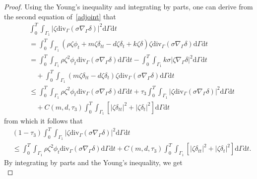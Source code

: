 \documentclass[10pt]{elsarticle}
\begin{document}
\begin{proof}
Using the Young's inequality and integrating by parts, one can derive from the second equation of~\eqref{adjoint} that
 \begin{equation*}
\begin{split}
&\int_{0}^{T}\int_{\Gamma_1}{|\zeta\mathrm{div}_{\Gamma}\left(\sigma\nabla_{\Gamma} {\delta}\right)|^2} \mathrm{d}\Gamma \mathrm{d}t\\
&=\int_{0}^{T}\int_{\Gamma_1}\left(\rho \zeta{\phi}_t+m \zeta{\delta}_{tt}- d \zeta{\delta}_t+ k \zeta{\delta} \right)\zeta\mathrm{div}_{\Gamma}\left(\sigma\nabla_{\Gamma} {\delta}\right) \mathrm{d}\Gamma \mathrm{d}t\\
&=\int_{0}^{T}\int_{\Gamma_1} \rho \zeta^2 {\phi}_t \mathrm{div}_{\Gamma}\left(\sigma\nabla_{\Gamma}{\delta}\right) \mathrm{d}\Gamma \mathrm{d}t -\int_{0}^{T}\int_{\Gamma_1}k\sigma|\zeta\nabla_{\Gamma} {\delta}|^2\mathrm{d}\Gamma \mathrm{d}t\\
&\quad+ \int_{0}^{T}\int_{\Gamma_1}\left(m \zeta{\delta}_{tt}- d \zeta{\delta}_t \right)\zeta \mathrm{div}_{\Gamma}\left(\sigma\nabla_{\Gamma} {\delta}\right) \mathrm{d}\Gamma \mathrm{d}t \\
&\leqslant \int_{0}^{T}\int_{\Gamma_1} \rho \zeta^2 {\phi}_t \mathrm{div}_{\Gamma}\left(\sigma\nabla_{\Gamma} {\delta}\right) \mathrm{d}\Gamma \mathrm{d}t +\tau_3\int_{0}^{T}\int_{\Gamma_1}|\zeta\mathrm{div}_{\Gamma}\left(\sigma\nabla_{\Gamma} {\delta}\right)|^2 \mathrm{d}\Gamma \mathrm{d}t\\
&\quad+ C(m, d, \tau_3)\int_{0}^{T}\int_{\Gamma_1}\left[|\zeta \delta_{tt}|^2 +|\zeta\delta_t|^2 \right]\mathrm{d}\Gamma \mathrm{d}t 
\end{split}
\end{equation*}
from which it follows that
 \begin{equation}\label{ob13}
\begin{split}
&(1-\tau_3)\int_{0}^{T}\int_{\Gamma_1}{|\zeta\mathrm{div}_{\Gamma}\left(\sigma\nabla_{\Gamma} {\delta}\right)|^2} \mathrm{d}\Gamma \mathrm{d}t\\
&\leqslant \int_{0}^{T}\int_{\Gamma_1} {\rho \zeta^2 {\phi}_t \mathrm{div}_{\Gamma}\left(\sigma\nabla_{\Gamma} {\delta}\right)} \mathrm{d}\Gamma \mathrm{d}t+ C(m, d, \tau_3)\int_{0}^{T}\int_{\Gamma_1}\left[|\zeta \delta_{tt}|^2 +|\zeta\delta_t|^2 \right]\mathrm{d}\Gamma \mathrm{d}t. 
\end{split}
\end{equation}
By integrating by parts and the Young's inequality, we get
\begin{equation*}

\end{equation*}
\end{proof}
\end{document}
